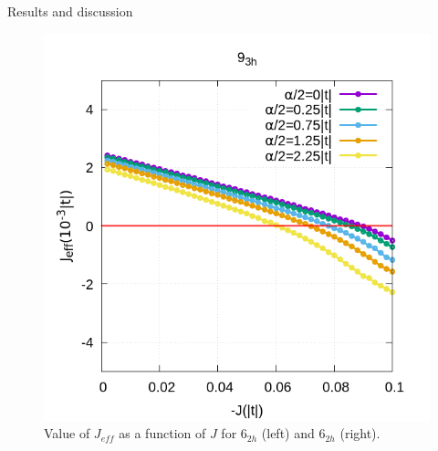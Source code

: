 \documentclass[12pt,twoside]{report}
\begin{document}
\begin{chapter}{Results and discussion}
\begin{figure}[h!]
		\begin{minipage}{0.4\textwidth}
			\includegraphics[scale=0.35]{Jeff_vs_J_ar3.png}
		\end{minipage}
		\caption{\label{fig_arj1} Value of $J_{eff}$ as a function of $J$ for 6$_{2h}$ (left) and 6$_{2h}$ (right). }
	\end{figure}
	

\end{chapter}
\end{document}
